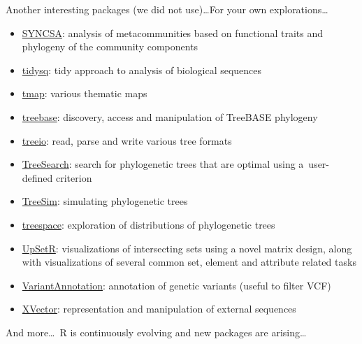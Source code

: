 \documentclass[compress, xelatex, 11pt, xcolor=svgnames, aspectratio=169, url={hyphens, lowtilde}]{beamer}
\begin{document}
\begin{frame}[allowframebreaks]{Another interesting packages (we did not use)\ldots}{For your own explorations\ldots}
\begin{itemize}
		\item \href{https://CRAN.R-project.org/package=SYNCSA}{SYNCSA}: analysis of metacommunities based on functional traits and phylogeny of the community components
		\item \href{https://CRAN.R-project.org/package=tidysq}{tidysq}: tidy approach to analysis of biological sequences
		\item \href{https://CRAN.R-project.org/package=tmap}{tmap}: various thematic maps
		\item \href{https://CRAN.R-project.org/package=treebase}{treebase}: discovery, access and manipulation of TreeBASE phylogeny
		\item \href{https://bioconductor.org/packages/release/bioc/html/treeio.html}{treeio}: read, parse and write various tree formats
		\item \href{https://CRAN.R-project.org/package=TreeSearch}{TreeSearch}: search for phylogenetic trees that are optimal using a~user-defined criterion
		\item \href{https://CRAN.R-project.org/package=TreeSim}{TreeSim}: simulating phylogenetic trees
		\item \href{https://CRAN.R-project.org/package=treespace}{treespace}: exploration of distributions of phylogenetic trees
		\item \href{https://CRAN.R-project.org/package=UpSetR}{UpSetR}: visualizations of intersecting sets using a novel matrix design, along with visualizations of several common set, element and attribute related tasks
		\item \href{https://bioconductor.org/packages/VariantAnnotation/}{VariantAnnotation}: annotation of genetic variants (useful to filter VCF)
		\item \href{https://bioconductor.org/packages/release/bioc/html/XVector.html}{XVector}: representation and manipulation of external sequences
	\end{itemize}
	And more\ldots~R is continuously evolving and new packages are arising\ldots
\end{frame}
\end{document}
